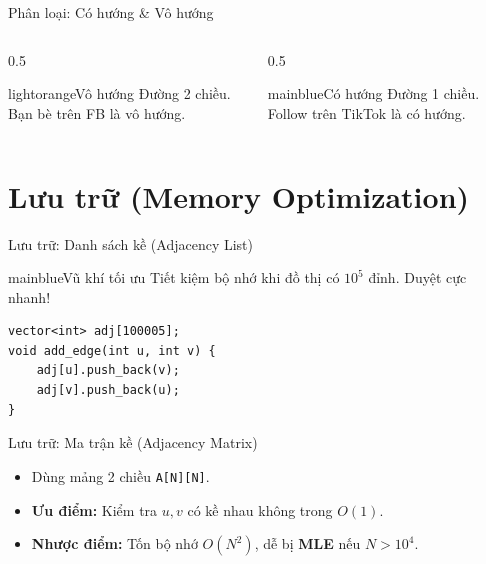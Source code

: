 \documentclass[10pt, xcolor={dvipsnames}]{beamer}
\begin{document}
\begin{frame}{Phân loại: Có hướng \& Vô hướng}
    \begin{columns}
        \begin{column}{0.5\textwidth}
            \begin{beautybox}{lightorange}{Vô hướng}
                Đường 2 chiều. Bạn bè trên FB là vô hướng.
            \end{beautybox}
            \centering
        \end{column}
        \begin{column}{0.5\textwidth}
            \begin{beautybox}{mainblue}{Có hướng}
                Đường 1 chiều. Follow trên TikTok là có hướng.
            \end{beautybox}
            \centering
        \end{column}
    \end{columns}
\end{frame}

\section{Lưu trữ (Memory Optimization)}
\begin{frame}[fragile]{Lưu trữ: Danh sách kề (Adjacency List)}
    \begin{beautybox}{mainblue}{Vũ khí tối ưu}
        Tiết kiệm bộ nhớ khi đồ thị có $10^5$ đỉnh. Duyệt cực nhanh!
    \end{beautybox}
    \begin{lstlisting}
vector<int> adj[100005];
void add_edge(int u, int v) {
    adj[u].push_back(v);
    adj[v].push_back(u); 
}
    \end{lstlisting}
\end{frame}

\begin{frame}{Lưu trữ: Ma trận kề (Adjacency Matrix)}
    \begin{itemize}
        \item Dùng mảng 2 chiều \texttt{A[N][N]}.
        \item \textbf{Ưu điểm:} Kiểm tra $u, v$ có kề nhau không trong $O(1)$.
        \item \textbf{Nhược điểm:} Tốn bộ nhớ $O(N^2)$, dễ bị \textbf{MLE} nếu $N > 10^4$.
    \end{itemize}
\end{frame}
\end{document}
